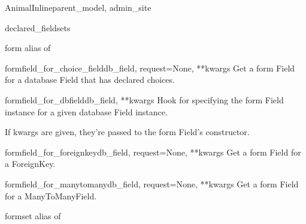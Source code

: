 \documentclass[letterpaper,10pt,english]{sphinxmanual}
\begin{document}
\hypertarget{animal.admin.AnimalInline}{}\begin{classdesc}{AnimalInline}{parent\_model, admin\_site}~

\hypertarget{animal.admin.AnimalInline.declared_fieldsets}{}\begin{memberdesc}{declared\_fieldsets}\end{memberdesc}

\hypertarget{animal.admin.AnimalInline.form}{}\begin{memberdesc}{form}
alias of 
\end{memberdesc}

\hypertarget{animal.admin.AnimalInline.formfield_for_choice_field}{}\begin{methoddesc}{formfield\_for\_choice\_field}{db\_field, request=None, **kwargs}
Get a form Field for a database Field that has declared choices.
\end{methoddesc}

\hypertarget{animal.admin.AnimalInline.formfield_for_dbfield}{}\begin{methoddesc}{formfield\_for\_dbfield}{db\_field, **kwargs}
Hook for specifying the form Field instance for a given database Field
instance.

If kwargs are given, they're passed to the form Field's constructor.
\end{methoddesc}

\hypertarget{animal.admin.AnimalInline.formfield_for_foreignkey}{}\begin{methoddesc}{formfield\_for\_foreignkey}{db\_field, request=None, **kwargs}
Get a form Field for a ForeignKey.
\end{methoddesc}

\hypertarget{animal.admin.AnimalInline.formfield_for_manytomany}{}\begin{methoddesc}{formfield\_for\_manytomany}{db\_field, request=None, **kwargs}
Get a form Field for a ManyToManyField.
\end{methoddesc}

\hypertarget{animal.admin.AnimalInline.formset}{}\begin{memberdesc}{formset}
alias of 
\end{memberdesc}


\end{classdesc}
\end{document}
